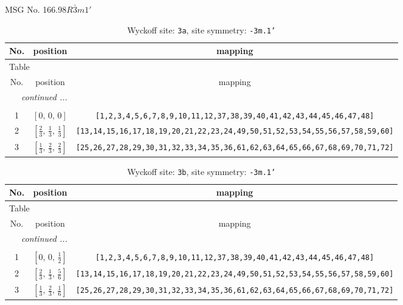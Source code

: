 \documentclass[fleqn,8pt]{jsarticle}
\begin{document}
\setcounter{MaxMatrixCols}{32}

\renewcommand{\tablename}{Table~}
\renewcommand{\figurename}{Figure~}
\begin{center}
\LARGE
MSG No. 166.98\quad$R\bar{3}m1'$
\end{center}
\renewcommand{\arraystretch}{1.2}
\begin{longtable}{ccc}
\caption{Wyckoff site: {\tt 3a}, site symmetry: {\tt -3m.1'}}
 \\
 \hline \hline
No. & position & mapping \\ \hline \endfirsthead

\multicolumn{2}{l}{\tablename\ \thetable{}} \\
 \hline \hline
No. & position & mapping \\ \hline \endhead

 \hline \hline
\multicolumn{2}{r}{\footnotesize\it continued ...} \\ \endfoot

 \hline \hline
\multicolumn{2}{r}{} \\ \endlastfoot

1 & $\left[ 0,\, 0,\, 0 \right]$ & {\tt [1,2,3,4,5,6,7,8,9,10,11,12,37,38,39,40,41,42,43,44,45,46,47,48]} \\ \hline
2 & $\left[ \frac{2}{3},\, \frac{1}{3},\, \frac{1}{3} \right]$ & {\tt [13,14,15,16,17,18,19,20,21,22,23,24,49,50,51,52,53,54,55,56,57,58,59,60]} \\ \hline
3 & $\left[ \frac{1}{3},\, \frac{2}{3},\, \frac{2}{3} \right]$ & {\tt [25,26,27,28,29,30,31,32,33,34,35,36,61,62,63,64,65,66,67,68,69,70,71,72]} \\
\end{longtable}
\renewcommand{\arraystretch}{1.2}
\begin{longtable}{ccc}
\caption{Wyckoff site: {\tt 3b}, site symmetry: {\tt -3m.1'}}
 \\
 \hline \hline
No. & position & mapping \\ \hline \endfirsthead

\multicolumn{2}{l}{\tablename\ \thetable{}} \\
 \hline \hline
No. & position & mapping \\ \hline \endhead

 \hline \hline
\multicolumn{2}{r}{\footnotesize\it continued ...} \\ \endfoot

 \hline \hline
\multicolumn{2}{r}{} \\ \endlastfoot

1 & $\left[ 0,\, 0,\, \frac{1}{2} \right]$ & {\tt [1,2,3,4,5,6,7,8,9,10,11,12,37,38,39,40,41,42,43,44,45,46,47,48]} \\ \hline
2 & $\left[ \frac{2}{3},\, \frac{1}{3},\, \frac{5}{6} \right]$ & {\tt [13,14,15,16,17,18,19,20,21,22,23,24,49,50,51,52,53,54,55,56,57,58,59,60]} \\ \hline
3 & $\left[ \frac{1}{3},\, \frac{2}{3},\, \frac{1}{6} \right]$ & {\tt [25,26,27,28,29,30,31,32,33,34,35,36,61,62,63,64,65,66,67,68,69,70,71,72]} \\
\end{longtable}
\end{document}
